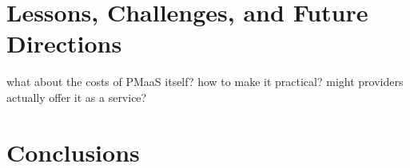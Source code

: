 \documentclass{acm_proc_article-sp}
\begin{document}
\section{Lessons, Challenges, and Future Directions}
\label{sec:future}

what about the costs of PMaaS itself? how to make it practical? might providers actually offer it as a service?

\section{Conclusions}
\label{sec:conclus}



%

%
%

\balancecolumns
\end{document}
